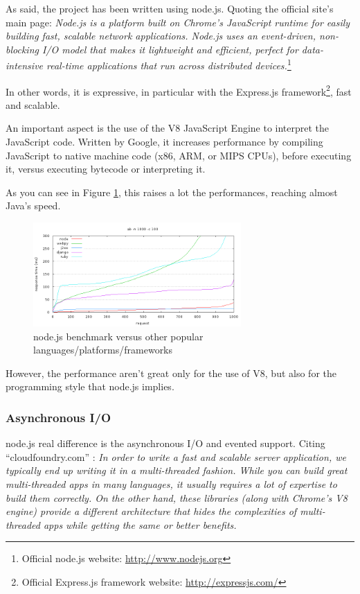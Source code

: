 As said, the project has been written using node.js. Quoting the official site's main page: \textit{Node.js is a platform built on Chrome's JavaScript runtime for easily building fast, scalable network applications. Node.js uses an event-driven, non-blocking I/O model that makes it lightweight and efficient, perfect for data-intensive real-time applications that run across distributed devices.}\footnote{Official node.js website: \url{http://www.nodejs.org}}

In other words, it is expressive, in particular with the Express.js framework\footnote{Official Express.js framework website: \url{http://expressjs.com/}}, fast and scalable. 

An important aspect is the use of the V8 JavaScript Engine to interpret the JavaScript code. Written by Google, it increases performance by compiling JavaScript to native machine code (x86, ARM, or MIPS CPUs)\cite{website:v8-intro}, before executing it, versus executing bytecode or interpreting it.

As you can see in Figure \ref{fig:nodeBench}, this raises a lot the performances, reaching almost Java's speed.

\begin{figure}[H]
\centering %
\includegraphics[height=150px]{img/node-bench.png}
\caption{node.js benchmark versus other popular languages/platforms/frameworks}
\label{fig:nodeBench}
\end{figure}

However, the performance aren't great only for the use of V8, but also for the programming style that node.js implies.

\subsubsection{Asynchronous I/O}
\label{sec:async}

node.js real difference is the asynchronous I/O and evented support. Citing ``cloudfoundry.com'' \cite{website:cloudfoundry}: \textit{In order to write a fast and scalable server application, we typically end up writing it in a multi-threaded fashion. While you can build great multi-threaded apps in many languages, it usually requires a lot of expertise to build them correctly. On the other hand, these libraries (along with Chrome’s V8 engine) provide a different architecture that hides the complexities of multi-threaded apps while getting the same or better benefits.}

